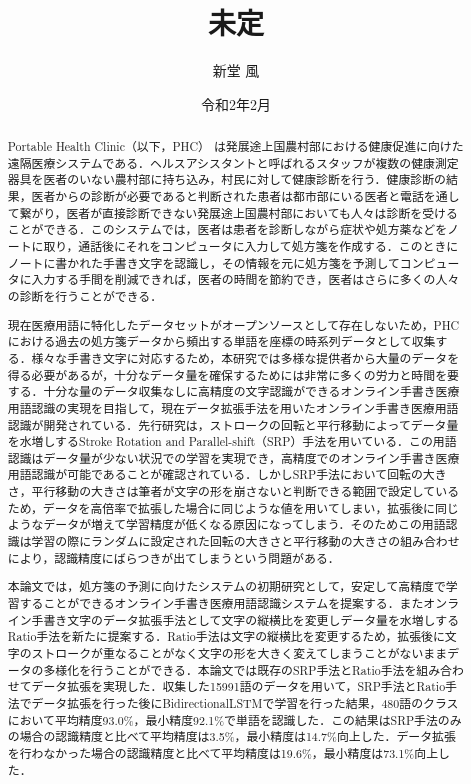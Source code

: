 \documentclass[a4paper,12pt]{jreport}
\title{未定}
\author{新堂 風}
\date{令和2年2月}
\begin{document}
\maketitle
\thispagestyle{empty}

\begin{abstract}
 Portable Health Clinic（以下，PHC） は発展途上国農村部における健康促進に向けた遠隔医療システムである．ヘルスアシスタントと呼ばれるスタッフが複数の健康測定器具を医者のいない農村部に持ち込み，村民に対して健康診断を行う．健康診断の結果，医者からの診断が必要であると判断された患者は都市部にいる医者と電話を通して繋がり，医者が直接診断できない発展途上国農村部においても人々は診断を受けることができる．このシステムでは，医者は患者を診断しながら症状や処方薬などをノートに取り，通話後にそれをコンピュータに入力して処方箋を作成する．このときにノートに書かれた手書き文字を認識し，その情報を元に処方箋を予測してコンピュータに入力する手間を削減できれば，医者の時間を節約でき，医者はさらに多くの人々の診断を行うことができる．

現在医療用語に特化したデータセットがオープンソースとして存在しないため，PHCにおける過去の処方箋データから頻出する単語を座標の時系列データとして収集する．様々な手書き文字に対応するため，本研究では多様な提供者から大量のデータを得る必要があるが，十分なデータ量を確保するためには非常に多くの労力と時間を要する．十分な量のデータ収集なしに高精度の文字認識ができるオンライン手書き医療用語認識の実現を目指して，現在データ拡張手法を用いたオンライン手書き医療用語認識\cite{takahashi}が開発されている．先行研究\cite{takahashi}は，ストロークの回転と平行移動によってデータ量を水増しするStroke Rotation and Parallel-shift（SRP）手法を用いている．この用語認識はデータ量が少ない状況での学習を実現でき，高精度でのオンライン手書き医療用語認識が可能であることが確認されている．しかしSRP手法において回転の大きさ，平行移動の大きさは筆者が文字の形を崩さないと判断できる範囲で設定しているため，データを高倍率で拡張した場合に同じような値を用いてしまい，拡張後に同じようなデータが増えて学習精度が低くなる原因になってしまう．そのためこの用語認識は学習の際にランダムに設定された回転の大きさと平行移動の大きさの組み合わせにより，認識精度にばらつきが出てしまうという問題がある．

本論文では，処方箋の予測に向けたシステムの初期研究として，安定して高精度で学習することができるオンライン手書き医療用語認識システムを提案する．またオンライン手書き文字のデータ拡張手法として文字の縦横比を変更しデータ量を水増しするRatio手法を新たに提案する．Ratio手法は文字の縦横比を変更するため，拡張後に文字のストロークが重なることがなく文字の形を大きく変えてしまうことがないままデータの多様化を行うことができる．本論文では既存のSRP手法とRatio手法を組み合わせてデータ拡張を実現した．収集した15991語のデータを用いて，SRP手法とRatio手法でデータ拡張を行った後にBidirectionalLSTMで学習を行った結果，480語のクラスにおいて平均精度93.0\%，最小精度92.1\%で単語を認識した．この結果はSRP手法のみの場合の認識精度と比べて平均精度は3.5\%，最小精度は14.7\%向上した．データ拡張を行わなかった場合の認識精度と比べて平均精度は19.6\%，最小精度は73.1\%向上した．
\end{abstract}
\end{document}
